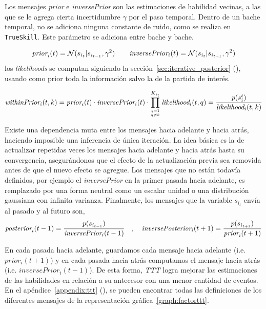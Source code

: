 \documentclass[11pt,twoside,spanish]{report} %
\newcommand\hfrac[2]{\genfrac{}{}{0pt}{}{#1}{#2}}
\newcommand{\N}{\mathcal{N}}
\begin{document}
Los mensajes \emph{prior} e \emph{inversePrior} son las estimaciones de habilidad vecinas, a las que se le agrega cierta incertidumbre $\gamma$ por el paso temporal.
Dentro de un bache temporal, no se adiciona ninguna constante de ruido, como se realiza en \texttt{TrueSkill}. 
Este par\'ametro se adiciona entre bache y bache.


\begin{equation*}
\emph{prior}_i(t) = \N(s_{i_t}|s_{i_{t-1}}, \gamma^2) \ \ \ \ \ \ \emph{inversePrior}_i(t) = \N(s_{i_t}|s_{i_{t+1}}, \gamma^2)
\end{equation*}
%
los \textit{likelihoods} se computan siguiendo la secci\'on~\ref{sec:iterative_posterior} (), usando como prior toda la informaci\'on salvo la de la partida de inter\'es.

 \begin{equation}
 \emph{withinPrior}_i(t,k) = \emph{prior}_i(t) \cdot \emph{inversePrior}_i(t) \cdot \prod_{\hfrac{q=1}{q\neq k}}^{K_{i_t}} \emph{likelihood}_i(t,q) = \frac{p(s_i^t) }{\emph{likelihood}_i(t,k)}
 \end{equation}
 
Existe una dependencia muta entre los mensajes hacia adelante y hacia atr\'as, haciendo imposible una inferencia de \'unica iteraci\'on.
La idea b\'asica es la de actualizar repetidas veces los mensajes hacia adelante y hacia atr\'as hasta su convergencia, asegur\'andonos que el efecto de la actualizaci\'on previa sea removida antes de que el nuevo efecto se agregue.
Los mensajes que no est\'an todav\'ia definidos, por ejemplo el \emph{inversePrior} en la primer pasada hacia adelante, es remplazado por una forma neutral como un escalar unidad o una distribuci\'on gaussiana con infinita varianza.
Finalmente, los mensajes que la variable $s_{i_t}$ env\'ia al pasado y al futuro son,
%
\begin{equation*}
  \emph{posterior}_i(t-1) = \frac{p(s_{i_{t-1}})}{\emph{inversePrior}_i(t-1)} \ \ \ , \ \ \ \emph{inversePosterior}_i(t+1) = \frac{p(s_{i_{t+1}})}{\emph{prior}_i(t+1)}
\end{equation*}

En cada pasada hacia adelante, guardamos cada mensaje hacia adelante (i.e. $prior_i(t+1)$) y en cada pasada hacia atr\'as computamos el mensaje hacia atr\'as (i.e. $inversePrior_i(t-1)$).
De esta forma, \textit{TTT} logra mejorar las estimaciones de las habilidades en relaci\'on a su antecesor con una menor cantidad de eventos.
En el ap\'endice~\ref{appendix:ttt} (), se pueden encontrar todas las definiciones de los diferentes mensajes de la representaci\'on gr\'afica~\ref{graph:factorttt}.
 
\end{document}
